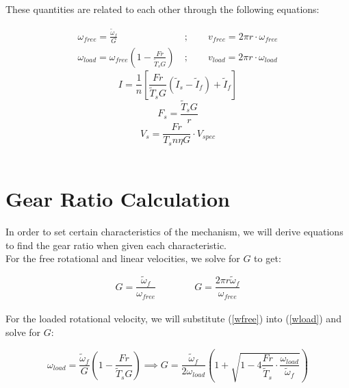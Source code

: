 \documentclass[a4paper]{article}
\begin{document}
	These quantities are related to each other through the following equations:
	
	\begin{align}
		\omega_{free} = \frac{\widetilde{\omega}_f}{G}\ &; \qquad v_{free} = 2\pi r \cdot \omega_{free} \label{wfree} \\
		\omega_{load} = \omega_{free} \left( 1 - \frac{F r}{\widetilde{T}_s G} \right)\ &; \qquad v_{load} = 2\pi r \cdot \omega_{load} \label{wload}
	\end{align}
	\begin{equation} \label{current}
		I = \frac{1}{n} \left[ \frac{F r}{\widetilde{T}_s G} \left( \widetilde{I}_s - \widetilde{I}_f \right) + \widetilde{I}_f \right]
	\end{equation}
	\begin{equation} \label{Fs}
		F_s = \frac{\widetilde{T}_s G}{r}
	\end{equation}
	\begin{equation} \label{Vs}
		V_s = \frac{F r}{T_s n \eta G} \cdot V_{spec}
	\end{equation}\\
	
	
	\section{Gear Ratio Calculation}
	
	In order to set certain characteristics of the mechanism, we will derive equations to find the gear ratio when given each characteristic.\\
	
	For the free rotational and linear velocities, we solve for $ G $ to get:
	
	\begin{equation}
		G = \frac{\widetilde{\omega}_f}{\omega_{free}} \qquad\qquad G = \frac{2\pi r \widetilde{\omega}_f}{\omega_{free}}
	\end{equation}\\
	
	For the loaded rotational velocity, we will substitute (\ref{wfree}) into (\ref{wload}) and solve for $ G $:
	
	\begin{equation}
		\omega_{load} = \frac{\widetilde{\omega}_f}{G} \left( 1 - \frac{F r}{\widetilde{T}_s G} \right) \implies
		G = \frac{\widetilde{\omega}_f}{2 \omega_{load}} \left( 1 + \sqrt{1 - 4 \frac{F r}{\widetilde{T}_s} \cdot \frac{\omega_{load}}{\widetilde{\omega}_f}} \right)
	\end{equation}\\
	
\end{document}
